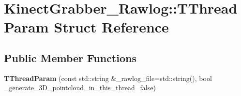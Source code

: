 \hypertarget{struct_kinect_grabber___rawlog_1_1_t_thread_param}{
\section{KinectGrabber\_\-Rawlog::TThreadParam Struct Reference}
\label{struct_kinect_grabber___rawlog_1_1_t_thread_param}
}
\subsection*{Public Member Functions}
\begin{DoxyCompactItemize}
\item 
\hypertarget{struct_kinect_grabber___rawlog_1_1_t_thread_param_ad74f52ed635f96eccd143d0d82975342}{
{\bfseries TThreadParam} (const std::string \&\_\-rawlog\_\-file=std::string(), bool \_\-generate\_\-3D\_\-pointcloud\_\-in\_\-this\_\-thread=false)}
\label{struct_kinect_grabber___rawlog_1_1_t_thread_param_ad74f52ed635f96eccd143d0d82975342}

\end{DoxyCompactItemize}
